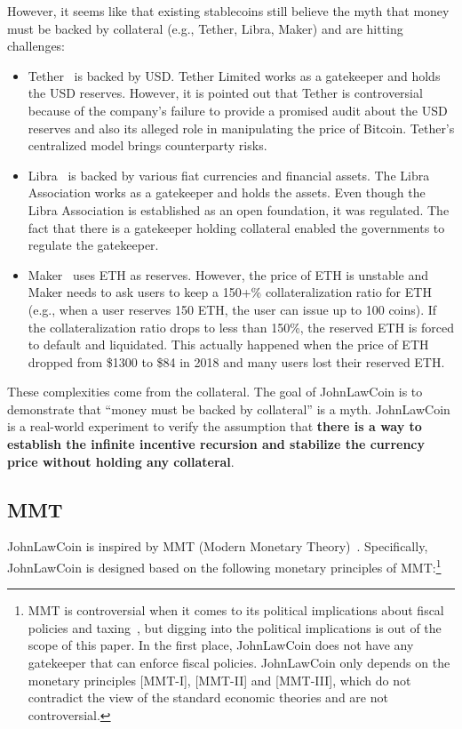 \documentclass[dvipdfmx,a4paper]{article}
\begin{document}
However, it seems like that existing stablecoins still believe the myth that money must be backed by collateral (e.g., Tether, Libra, Maker) and are hitting challenges:

\begin{itemize}
\item Tether~\cite{tether} is backed by USD. Tether Limited works as a gatekeeper and holds the USD reserves. However, it is pointed out that Tether is controversial because of the company's failure to provide a promised audit about the USD reserves and also its alleged role in manipulating the price of Bitcoin. Tether's centralized model brings counterparty risks.
\item Libra~\cite{libra} is backed by various fiat currencies and financial assets. The Libra Association works as a gatekeeper and holds the assets. Even though the Libra Association is established as an open foundation, it was regulated. The fact that there is a gatekeeper holding collateral enabled the governments to regulate the gatekeeper.
\item Maker~\cite{makerdao} uses ETH as reserves. However, the price of ETH is unstable and Maker needs to ask users to keep a 150+\% collateralization ratio for ETH (e.g., when a user reserves 150 ETH, the user can issue up to 100 coins). If the collateralization ratio drops to less than 150\%, the reserved ETH is forced to default and liquidated. This actually happened when the price of ETH dropped from \$1300 to \$84 in 2018 and many users lost their reserved ETH.
\end{itemize}

These complexities come from the collateral. The goal of JohnLawCoin is to demonstrate that ``money must be backed by collateral'' is a myth. JohnLawCoin is a real-world experiment to verify the assumption that \textbf{there is a way to establish the infinite incentive recursion and stabilize the currency price without holding any collateral}.

\subsection{MMT}

JohnLawCoin is inspired by MMT (Modern Monetary Theory)~\cite{kelton2020deficit,mmt2016wray}. Specifically, JohnLawCoin is designed based on the following monetary principles of MMT:\footnote{MMT is controversial when it comes to its political implications about fiscal policies and taxing~\cite{palley2015money}, but digging into the political implications is out of the scope of this paper. In the first place, JohnLawCoin does not have any gatekeeper that can enforce fiscal policies. JohnLawCoin only depends on the monetary principles [MMT-I], [MMT-II] and [MMT-III], which do not contradict the view of the standard economic theories and are not controversial.}
\end{document}
